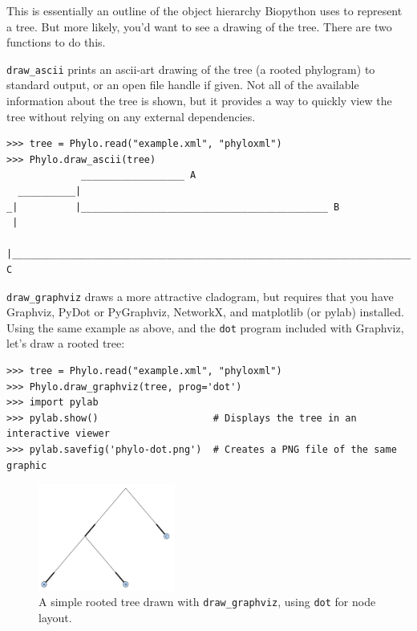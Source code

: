 \documentclass{report}
\begin{document}
This is essentially an outline of the object hierarchy Biopython uses to represent a tree. But
more likely, you'd want to see a drawing of the tree. There are two functions to do this.

\verb|draw_ascii| prints an ascii-art drawing of the tree (a rooted phylogram) to standard
output, or an open file handle if given. Not all of the available information about the tree is
shown, but it provides a way to quickly view the tree without relying on any external
dependencies.

\begin{verbatim}
>>> tree = Phylo.read("example.xml", "phyloxml")
>>> Phylo.draw_ascii(tree)
             __________________ A
  __________|
_|          |___________________________________________ B
 |
 |___________________________________________________________________________ C

\end{verbatim}

\verb|draw_graphviz| draws a more attractive cladogram, but requires that you have Graphviz,
PyDot or PyGraphviz, NetworkX, and matplotlib (or pylab) installed. Using the same example as
above, and the \verb|dot| program included with Graphviz, let's draw a rooted tree:

\begin{verbatim}
>>> tree = Phylo.read("example.xml", "phyloxml")
>>> Phylo.draw_graphviz(tree, prog='dot')
>>> import pylab
>>> pylab.show()                    # Displays the tree in an interactive viewer
>>> pylab.savefig('phylo-dot.png')  # Creates a PNG file of the same graphic
\end{verbatim}

\begin{htmlonly}
\label{fig:phylo-dot}
\end{htmlonly}

\begin{latexonly}
\begin{figure}[htb]
\centering
\includegraphics[width=0.4\textwidth]{images/phylo-dot.png}
\caption{A simple rooted tree drawn with {\tt draw\_graphviz}, using {\tt dot} for node
layout.}
\label{fig:phylo-dot}
\end{figure}
\end{latexonly}
\end{document}
